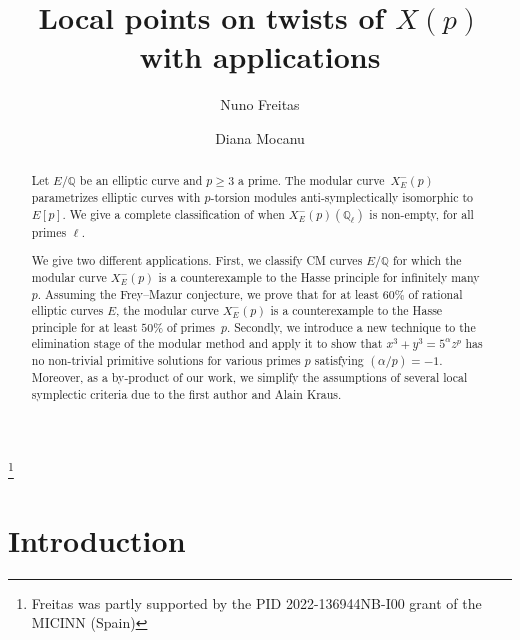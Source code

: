 \documentclass[12pt]{amsart}
\numberwithin{equation}{section}
\theoremstyle{definition}
\newcommand{\Q}{\mathbb{Q}}
\begin{document}
\title {Local points on twists of $X(p)$ with applications}
\author{Nuno Freitas}
\address{Instituto de Ciencias Matemáticas (ICMAT),
          Nicolás Cabrera 13-15
         28049 Madrid, Spain}

\author{Diana Mocanu}
\address{Max Planck Institute for Mathematics,
          Vivatsgasse 7, 
         53111 Bonn, Germany
         }

\thanks{Freitas was partly supported by the PID 2022-136944NB-I00 grant of the MICINN
(Spain)}



\begin{abstract}
Let $E/\mathbb Q$ be an elliptic curve and $p \geq 3$ a prime.
The modular curve~$X_E^-(p)$ parametrizes elliptic curves with $p$-torsion modules anti-symplectically isomorphic to~$E[p]$. We give a complete classification of when $X_E^-(p)(\Q_\ell)$ is non-empty, for all primes $\ell$.

We give two different applications. First, we classify CM curves $E/\Q$ for which the modular curve $X_E^-(p)$ is a counterexample to the Hasse principle for infinitely many~$p$. Assuming the Frey--Mazur conjecture, we prove that for at least $60\%$ of rational elliptic curves $E$, the modular curve $X_E^-(p)$ is a counterexample to the Hasse principle for at least $50\%$ of primes~$p$. Secondly, we introduce a new technique to the elimination stage of the modular method and apply it to show that $x^3+y^3=5^\alpha z^p$ has no non-trivial primitive solutions for various primes $p$ satisfying $(\alpha/p)=-1$.
Moreover, as a by-product of our work, we simplify the assumptions of several local symplectic criteria due to the first author and Alain Kraus.

\end{abstract}

\maketitle
\vspace{-8mm}
\section{Introduction}
\end{document}
